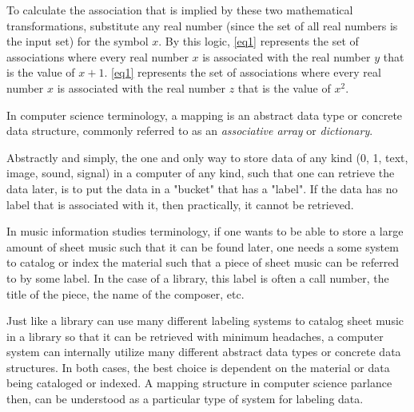 To calculate the association that is implied by these two mathematical transformations, substitute any real number (since the set of all real numbers is the input set) for the symbol \begin{math}x\end{math}. By this logic, \ref{eq1} represents the set of associations where every real number \begin{math}x\end{math} is associated with the real number \begin{math}y\end{math} that is the value of \begin{math}x + 1\end{math}. \ref{eq1} represents the set of associations where every real number \begin{math}x\end{math} is associated with the real number \begin{math}z\end{math} that is the value of \begin{math}x^{2}\end{math}.

In computer science terminology, a mapping is an abstract data type or concrete data structure, commonly referred to as an \emph{associative array} or \emph{dictionary}.  

Abstractly and simply, the one and only way to store data of any kind (0, 1, text, image, sound, signal) in a computer of any kind, such that one can retrieve the data later, is to put the data in a "bucket" that has a "label". If the data has no label that is associated with it, then practically, it cannot be retrieved. 

In music information studies terminology, if one wants to be able to store a large amount of sheet music such that it can be found later, one needs a some system to catalog or index the material such that a piece of sheet music can be referred to by some label. In the case of a library, this label is often a call number, the title of the piece, the name of the composer, etc.

Just like a library can use many different labeling systems to catalog sheet music in a library so that it can be retrieved with minimum headaches, a computer system can internally utilize many different abstract data types or concrete data structures. In both cases, the best choice is dependent on the material or data being cataloged or indexed. A mapping structure in computer science parlance then, can be understood as a particular type of system for labeling data.


